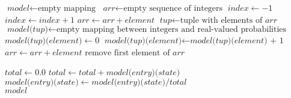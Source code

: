 \documentclass{article}
\begin{document}
    \begin{algorithm}
    \begin{algorithmic}[1]
        \State $\textit{model} \gets \text{empty mapping}$
        \State $\textit{arr} \gets \text{empty sequence of integers}$
        \State $\textit{index} \gets -1$
            \State $\textit{index} \gets \textit{index}+1$
                \State $\textit{arr} \gets arr + \textit{element}$
            \Else
                \State $\textit{tup} \gets \text{tuple with elements of } \textit{arr}$
                    \State $\textit{model(tup)} \gets \text{empty mapping between integers and real-valued probabilities}$
                \EndIf
                    \State $\textit{model(tup)(element)} \gets 0$
                \EndIf
                \State $\textit{model(tup)(element)} \gets \textit{model(tup)(element) + 1}$
                \State $\textit{arr} \gets arr + element$
                \State $\text{remove first element of } \textit{arr}$
            \EndIf
        \EndFor
        
            \State $\textit{total} \gets 0.0$
                \State $\textit{total} \gets \textit{total} + \textit{model(entry)(state)}$
            \EndFor
                \State $\textit{model(entry)(state)} \gets \textit{model(entry)(state)}/\textit{total}$
            \EndFor
        \EndFor\\
        \hspace*{4mm} \Return $\textit{model}$
        \EndProcedure
    \end{algorithmic}
    \end{algorithm}
    
\end{document}
